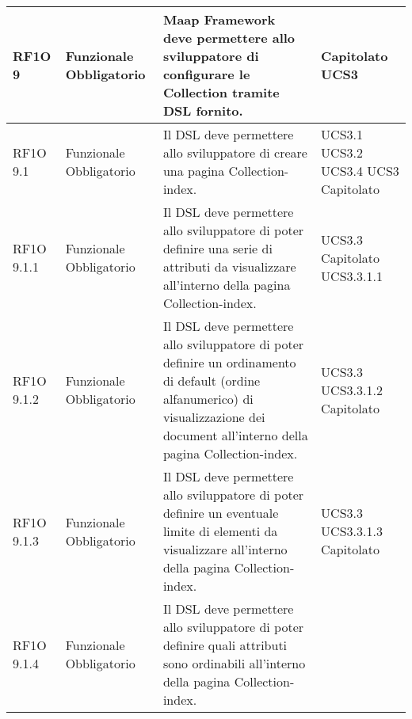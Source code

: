 \begin{center}
\begin{longtable}{ | l | p{2cm} | p{5cm} | p{1.7cm} |}
        RF1O 9  & Funzionale \newline  Obbligatorio  & Maap Framework deve permettere allo sviluppatore di configurare le Collection tramite DSL fornito.
 &  Capitolato \newline  UCS3 \newline  \\ \hline      
        RF1O 9.1  & Funzionale \newline  Obbligatorio  & Il DSL deve permettere allo sviluppatore di creare una pagina Collection-index.
 &  UCS3.1 \newline  UCS3.2 \newline  UCS3.4 \newline  UCS3 \newline  Capitolato \newline  \\ \hline      
        RF1O 9.1.1  & Funzionale \newline  Obbligatorio  & Il DSL deve permettere allo sviluppatore di poter definire una serie di attributi da visualizzare all'interno della pagina Collection-index.
 &  UCS3.3 \newline  Capitolato \newline  UCS3.3.1.1 \newline  \\ \hline      
        RF1O 9.1.2  & Funzionale \newline  Obbligatorio  & Il DSL deve permettere allo sviluppatore di poter definire un ordinamento di default (ordine alfanumerico) di visualizzazione dei document all'interno della pagina Collection-index. &  UCS3.3 \newline  UCS3.3.1.2 \newline  Capitolato \newline  \\ \hline      
        RF1O 9.1.3  & Funzionale \newline  Obbligatorio  & Il DSL deve permettere allo sviluppatore di poter definire un eventuale limite di elementi da visualizzare all'interno della pagina Collection-index.
 &  UCS3.3 \newline  UCS3.3.1.3 \newline  Capitolato \newline  \\ \hline      
        RF1O 9.1.4  & Funzionale \newline  Obbligatorio  & Il DSL deve permettere allo sviluppatore di poter definire quali attributi sono ordinabili all'interno della pagina Collection-index.

\end{longtable}
\end{center}
